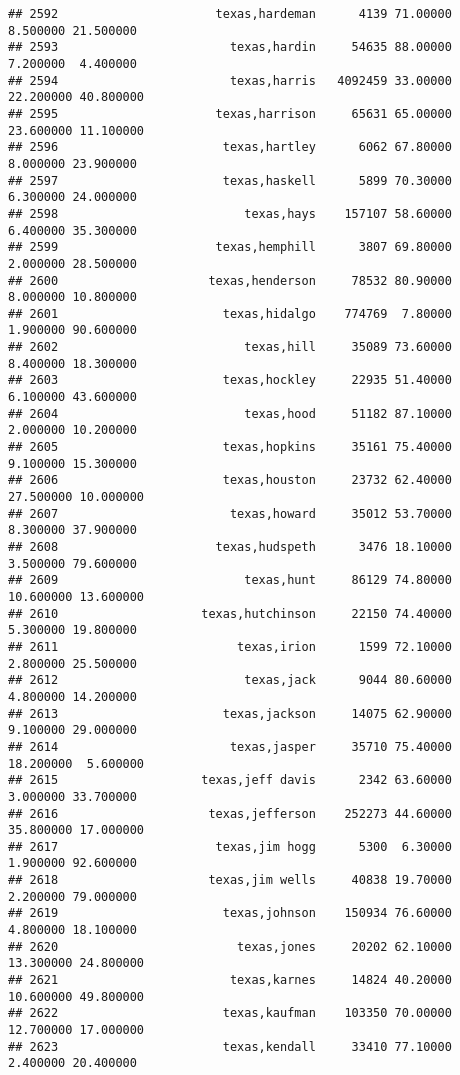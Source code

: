 \documentclass[
]{article}
\begin{document}
\begin{verbatim}
## 2592                      texas,hardeman      4139 71.00000  8.500000 21.500000
## 2593                        texas,hardin     54635 88.00000  7.200000  4.400000
## 2594                        texas,harris   4092459 33.00000 22.200000 40.800000
## 2595                      texas,harrison     65631 65.00000 23.600000 11.100000
## 2596                       texas,hartley      6062 67.80000  8.000000 23.900000
## 2597                       texas,haskell      5899 70.30000  6.300000 24.000000
## 2598                          texas,hays    157107 58.60000  6.400000 35.300000
## 2599                      texas,hemphill      3807 69.80000  2.000000 28.500000
## 2600                     texas,henderson     78532 80.90000  8.000000 10.800000
## 2601                       texas,hidalgo    774769  7.80000  1.900000 90.600000
## 2602                          texas,hill     35089 73.60000  8.400000 18.300000
## 2603                       texas,hockley     22935 51.40000  6.100000 43.600000
## 2604                          texas,hood     51182 87.10000  2.000000 10.200000
## 2605                       texas,hopkins     35161 75.40000  9.100000 15.300000
## 2606                       texas,houston     23732 62.40000 27.500000 10.000000
## 2607                        texas,howard     35012 53.70000  8.300000 37.900000
## 2608                      texas,hudspeth      3476 18.10000  3.500000 79.600000
## 2609                          texas,hunt     86129 74.80000 10.600000 13.600000
## 2610                    texas,hutchinson     22150 74.40000  5.300000 19.800000
## 2611                         texas,irion      1599 72.10000  2.800000 25.500000
## 2612                          texas,jack      9044 80.60000  4.800000 14.200000
## 2613                       texas,jackson     14075 62.90000  9.100000 29.000000
## 2614                        texas,jasper     35710 75.40000 18.200000  5.600000
## 2615                    texas,jeff davis      2342 63.60000  3.000000 33.700000
## 2616                     texas,jefferson    252273 44.60000 35.800000 17.000000
## 2617                      texas,jim hogg      5300  6.30000  1.900000 92.600000
## 2618                     texas,jim wells     40838 19.70000  2.200000 79.000000
## 2619                       texas,johnson    150934 76.60000  4.800000 18.100000
## 2620                         texas,jones     20202 62.10000 13.300000 24.800000
## 2621                        texas,karnes     14824 40.20000 10.600000 49.800000
## 2622                       texas,kaufman    103350 70.00000 12.700000 17.000000
## 2623                       texas,kendall     33410 77.10000  2.400000 20.400000

\end{verbatim}
\end{document}
